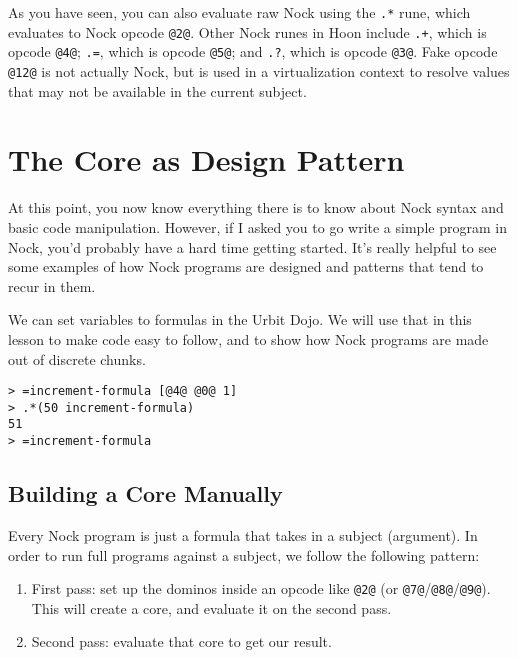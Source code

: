 \documentclass[twoside]{article}
\begin{document}
As you have seen, you can also evaluate raw Nock using the \lstinline[style=inlinecode]{.*} rune, which evaluates to Nock opcode \lstinline[style=inlinecode]{@2@}.  Other Nock runes in Hoon include \lstinline[style=inlinecode]{.+}, which is opcode \lstinline[style=inlinecode]{@4@}; \lstinline[style=inlinecode]{.=}, which is opcode \lstinline[style=inlinecode]{@5@}; and \lstinline[style=inlinecode]{.?}, which is opcode \lstinline[style=inlinecode]{@3@}.  Fake opcode \lstinline[style=inlinecode]{@12@} is not actually Nock, but is used in a virtualization context to resolve values that may not be available in the current subject.

\section{The Core as Design Pattern}

At this point, you now know everything there is to know about Nock syntax and basic code manipulation.  However, if I asked you to go write a simple program in Nock, you'd probably have a hard time getting started. It's really helpful to see some examples of how Nock programs are designed and patterns that tend to recur in them.

We can set variables to formulas in the Urbit Dojo. We will use that in this lesson to make code easy to follow, and to show how Nock programs are made out of discrete chunks.

\begin{lstlisting}[style=listingcode]
> =increment-formula [@4@ @0@ 1]
> .*(50 increment-formula)
51
> =increment-formula
\end{lstlisting}

\subsection{Building a Core Manually}

Every Nock program is just a formula that takes in a subject (argument). In order to run full programs against a subject, we follow the following pattern:

\begin{enumerate}
  \item  First pass:  set up the dominos inside an opcode like \lstinline[style=inlinecode]{@2@} (or \lstinline[style=inlinecode]{@7@}/\lstinline[style=inlinecode]{@8@}/\lstinline[style=inlinecode]{@9@}). This will create a core, and evaluate it on the second pass.
  \item  Second pass:  evaluate that core to get our result.
\end{enumerate}
\end{document}
